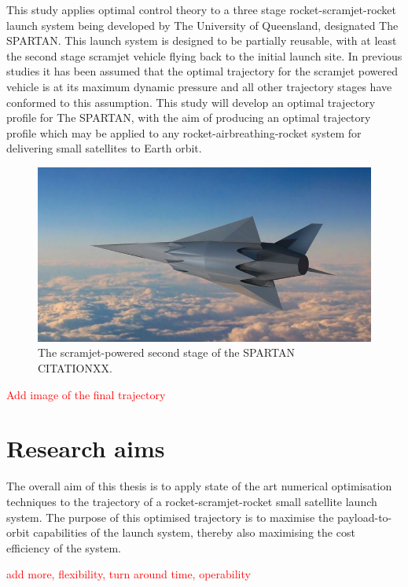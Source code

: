   
  	   This study applies optimal control theory to a three stage rocket-scramjet-rocket launch system being developed by The University of Queensland, designated The SPARTAN. This launch system is designed to be partially reusable, with at least the second stage scramjet vehicle flying back to the initial launch site. 
  	   In previous studies it has been assumed that the optimal trajectory for the scramjet powered vehicle is at its
  	   maximum dynamic pressure and all other trajectory stages have conformed to this assumption.
  	   This study will develop an optimal trajectory profile for The SPARTAN, with the aim of producing an optimal
  	   trajectory profile which may be applied to any rocket-airbreathing-rocket system for delivering small
  	   satellites to Earth orbit. 
  	   
  	  	\begin{figure}[ht]
  	  		\centering
  	  		\includegraphics[width=0.7\linewidth]{figures/1_introduction/project-spartan}
  	  		\caption{The scramjet-powered second stage of the SPARTAN CITATIONXX.}
  	  		\label{fig:project-spartan}
  	  	\end{figure}
  	  	
  	\textcolor{red}{Add image of the final trajectory}
  \section{Research aims}

    The overall aim of this thesis is to apply state of the art numerical optimisation techniques to the trajectory of a rocket-scramjet-rocket small satellite launch system. The purpose of this optimised trajectory is to maximise the payload-to-orbit capabilities of the launch system, thereby also maximising the cost efficiency of the system. 
    
    \textcolor{red}{add more, flexibility, turn around time, operability}
    

